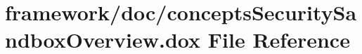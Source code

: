 \hypertarget{concepts_security_sandbox_overview_8dox}{}\section{framework/doc/concepts\+Security\+Sandbox\+Overview.dox File Reference}
\label{concepts_security_sandbox_overview_8dox}
